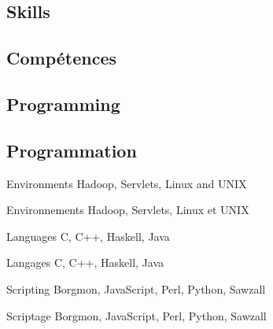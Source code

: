 \begin{langen}
\section{Skills}
\end{langen}
\begin{langfr}
\section{Comp\'{e}tences}
\end{langfr}



\begin{minipage}[t]{0.48\maincolumnwidth}

\begin{langen}
\subsection{Programming}
\end{langen}
\begin{langfr}
\subsection{Programmation}
\end{langfr}

\begin{description}
\begin{langen}
\item[Environments] Hadoop, Servlets, Linux and UNIX
\end{langen}
\begin{langfr}
\item[Environnements] Hadoop, Servlets, Linux et UNIX
\end{langfr}

\vspace{2 mm}

\begin{langen}
\item[Languages] C, C++, Haskell, Java
\end{langen}
\begin{langfr}
\item[Langages] C, C++, Haskell, Java
\end{langfr}

\vspace{2 mm}

\begin{langen}
\item[Scripting] Borgmon, JavaScript, Perl, Python, Sawzall
\end{langen}
\begin{langfr}
\item[Scriptage] Borgmon, JavaScript, Perl, Python, Sawzall
\end{langfr}

\end{description}
\end{minipage}
